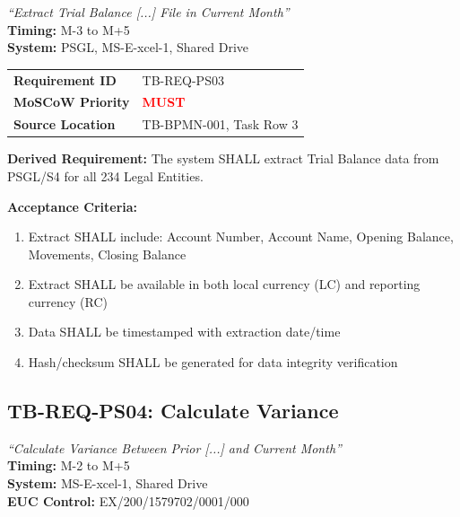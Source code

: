 \begin{tcolorbox}[colback=sourcegreen!5,colframe=sourcegreen!70,title=BPMN Task Extract]
\textit{``Extract Trial Balance [...] File in Current Month''}\\
\textbf{Timing:} M-3 to M+5\\
\textbf{System:} PSGL, MS-E-xcel-1, Shared Drive
\end{tcolorbox}

\begin{tabularx}{\textwidth}{@{}lX@{}}
\toprule
\textbf{Requirement ID} & TB-REQ-PS03 \\
\textbf{MoSCoW Priority} & \textcolor{red}{\textbf{MUST}} \\
\textbf{Source Location} & TB-BPMN-001, Task Row 3 \\
\bottomrule
\end{tabularx}

\textbf{Derived Requirement:} The system SHALL extract Trial Balance data from 
PSGL/S4 for all 234 Legal Entities.

\textbf{Acceptance Criteria:}
\begin{enumerate}[label=AC-PS03-\arabic*:]
    \item Extract SHALL include: Account Number, Account Name, Opening Balance, 
          Movements, Closing Balance
    \item Extract SHALL be available in both local currency (LC) and reporting 
          currency (RC)
    \item Data SHALL be timestamped with extraction date/time
    \item Hash/checksum SHALL be generated for data integrity verification
\end{enumerate}

\subsection{TB-REQ-PS04: Calculate Variance}
\label{req:tb-req-ps04}

\begin{tcolorbox}[colback=sourcegreen!5,colframe=sourcegreen!70,title=BPMN Task Extract]
\textit{``Calculate Variance Between Prior [...] and Current Month''}\\
\textbf{Timing:} M-2 to M+5\\
\textbf{System:} MS-E-xcel-1, Shared Drive\\
\textbf{EUC Control:} EX/200/1579702/0001/000
\end{tcolorbox}

